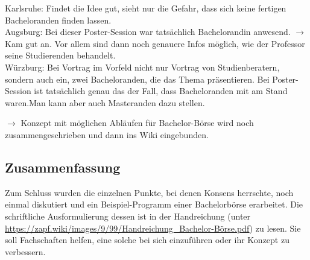     Karlsruhe: Findet die Idee gut, sieht nur die Gefahr, dass sich keine fertigen Bacheloranden finden lassen.\\

    Augsburg: Bei dieser Poster-Session war tatsächlich Bachelorandin anwesend. $\rightarrow$ Kam gut an. Vor allem sind dann noch genauere Infos möglich, wie der Professor seine Studierenden \flqq behandelt\frqq.\\

    Würzburg: Bei Vortrag im Vorfeld nicht nur Vortrag von Studienberatern, sondern auch ein, zwei Bacheloranden, die das Thema präsentieren. Bei Poster-Session ist tatsächlich genau das der Fall, dass Bacheloranden mit am Stand waren.Man kann aber auch Masteranden dazu stellen.

    $\rightarrow$ Konzept mit möglichen Abläufen für Bachelor-Börse wird noch zusammengeschrieben und dann ins Wiki eingebunden.

    \subsection*{Zusammenfassung}
      Zum Schluss wurden die einzelnen Punkte, bei denen Konsens herrschte, noch einmal diskutiert und ein Beispiel-Programm einer Bachelorbörse erarbeitet. Die schriftliche Ausformulierung dessen ist in der Handreichung (unter \url{https://zapf.wiki/images/9/99/Handreichung_Bachelor-Börse.pdf}) zu lesen. Sie soll Fachschaften helfen, eine solche bei sich einzuführen oder ihr Konzept zu verbessern.

